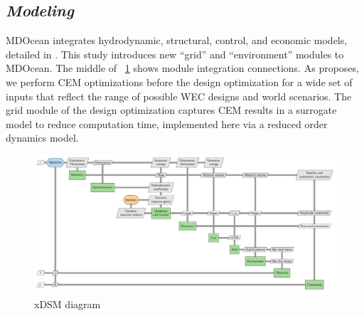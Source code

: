 \documentclass[10pt,twoside]{article}
\begin{document}
\subsection{\textit{Modeling}}
MDOcean integrates hydrodynamic, structural, control, and economic models, detailed in \cite{mccabe_leveraging_2025}.
This study introduces new ``grid'' and ``environment'' modules to MDOcean.
The middle of \figureautorefname~\ref{fig:n2} shows module integration connections.
As \cite{mccabe_system_2023} proposes, we perform CEM optimizations before the design optimization for a wide set of inputs that reflect the range of possible WEC designs and world scenarios. The grid module of the design optimization captures CEM results in a surrogate model to reduce computation time, implemented here via a reduced order dynamics model.
\begin{figure}[hbtp]
    \centering
    \includegraphics[width=.72\textwidth]{figures/out/xdsm_grid.pdf}
    \caption{xDSM diagram}
    \label{fig:n2}
\end{figure}

\clearpage
\end{document}

